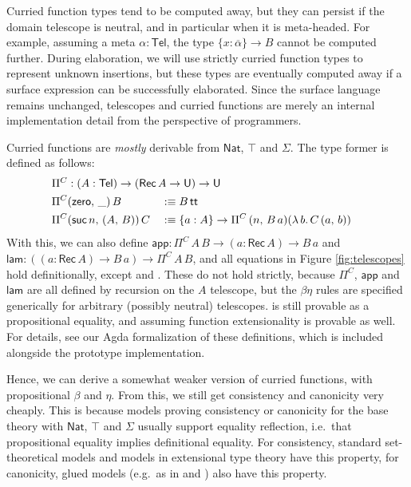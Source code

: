 \documentclass[acmsmall,screen,dvipsnames]{acmart}\settopmatter{}
\renewcommand{\U}{\mathsf{U}}
\renewcommand{\tt}{\mathsf{tt}}
\newcommand{\Nat}{\mathsf{Nat}}
\newcommand{\zero}{\mathsf{zero}}
\newcommand{\suc}{\mathsf{suc}}
\newcommand{\Tel}{\mathsf{Tel}}
\newcommand{\Rec}{\mathsf{Rec}}
\newcommand{\ol}[1]{\overline{#1}}
\theoremstyle{remark}
\begin{document}
Curried function types tend to be computed away, but they can persist if the
domain telescope is neutral, and in particular when it is meta-headed. For
example, assuming a meta $\alpha : \Tel$, the type $\{x : \ol{\alpha}\}\to B$
cannot be computed further. During elaboration, we will use strictly curried
function types to represent unknown insertions, but these types are eventually
computed away if a surface expression can be successfully elaborated. Since the
surface language remains unchanged, telescopes and curried functions are merely
an internal implementation detail from the perspective of programmers.

Curried functions are \emph{mostly} derivable from $\Nat$, $\top$ and $\Sigma$.
The type former is defined as follows:
\begin{alignat*}{3}
& \rlap{$\Pi^C : (A : \Tel) \to (\Rec\,A \to \U) \to \U$}\\
& \Pi^C (\zero,\,\_)\,B && :\equiv B\,\tt\\
& \Pi^C (\suc\,n,\,(A,\,B))\,C && :\equiv \{a : A\}\to \Pi^C\,(n,\,B\,a) (\lambda\,b.\,C\,(a,\,b))
\end{alignat*}
With this, we can also define $\mathsf{app} : \Pi^C\,A\,B \to (a : \Rec\,A) \to
B\, a$ and $\mathsf{lam} : ((a : \Rec\,A) \to B\, a) \to \Pi^C\,A\,B$, and all
equations in Figure \ref{fig:telescopes} hold definitionally, except
 and . These do not hold
strictly, because $\Pi^C$, $\mathsf{app}$ and $\mathsf{lam}$ are all defined by
recursion on the $A$ telescope, but the $\beta\eta$ rules are specified
generically for arbitrary (possibly neutral)
telescopes.  is still provable as a propositional
equality, and assuming function extensionality  is
provable as well. For details, see our Agda formalization of these definitions,
which is included alongside the prototype implementation.

Hence, we can derive a somewhat weaker version of curried functions, with
propositional $\beta$ and $\eta$. From this, we still get consistency and
canonicity very cheaply. This is because models proving consistency or
canonicity for the base theory with $\Nat$, $\top$ and $\Sigma$ usually support
equality reflection, i.e.\ that propositional equality implies definitional
equality. For consistency, standard set-theoretical models and models in
extensional type theory have this property, for canonicity, glued models
(e.g.\ as in \cite{kaposi2019gluing} and \cite{sterling2019algebraic}) also have
this property.
\end{document}
